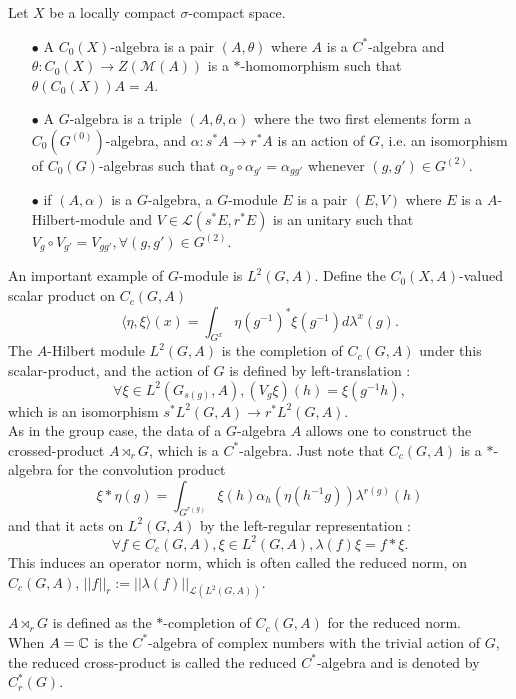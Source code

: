 \begin{definition}
Let $X$ be a locally compact $\sigma$-compact space.\\
\begin{itemize}
\item[$\bullet$] A $C_0(X)$-algebra is a pair $(A,\theta)$ where $A$ is a $C^*$-algebra and $\theta : C_0(X)\rightarrow Z(\mathcal M (A))$ is a $*$-homomorphism such that $\theta (C_0(X))A = A$.\\
\item[$\bullet$] A $G$-algebra is a triple $(A,\theta,\alpha)$ where the two first elements form a $C_0(G^{(0)})$-algebra, and $\alpha : s^* A \rightarrow r^* A $ is an action of $G$, i.e. an isomorphism of $C_0(G)$-algebras such that $\alpha_g \circ \alpha_{g'} = \alpha_{gg'}$ whenever $(g,g')\in G^{(2)}$.\\ 
\item[$\bullet$] if $(A,\alpha)$ is a $G$-algebra, a $G$-module $E$ is a pair $(E,V)$ where $E$ is a $A$-Hilbert-module and $V\in \mathcal L(s^*E,r^*E)$ is an unitary such that $V_g\circ V_{g'} = V_{gg'},\forall (g,g')\in G^{(2)}$.
\end{itemize}
\end{definition}

An important example of $G$-module is $L^2(G,A)$. Define the $C_0(X,A)$-valued scalar product on $C_c(G,A)$
\[ \langle \eta,\xi \rangle(x) = \int_{G^x} \eta(g^{-1})^* \xi(g^{-1}) d\lambda^x(g).\]
The $A$-Hilbert module $L^2(G,A)$ is the completion of $C_c(G,A)$ under this scalar-product, and the action of $G$ is defined by left-translation :
\[\forall \xi\in L^2(G_{s(g)},A),(V_g \xi)(h) = \xi(g^{-1}h), \]
which is an isomorphism $s^*L^2(G,A)\rightarrow r^*L^2(G,A)$.\\

As in the group case, the data of a $G$-algebra $A$ allows one to construct the crossed-product $A\rtimes_r G$, which is a $C^*$-algebra. Just note that $C_c(G,A)$ is a $*$-algebra for the convolution product 
\[\xi \ast \eta  (g)=\int_{G^{r(g)}} \xi(h)\alpha_{h}(\eta(h^{-1}g))\lambda^{r(g)}(h)\]
and that it acts on $L^2(G,A)$ by the left-regular representation :
\[\forall f\in C_c(G,A), \xi\in L^2(G,A),\lambda (f)\xi = f\ast \xi.\]
This induces an operator norm, which is often called the reduced norm, on $C_c(G,A)$, $||f||_{r}:= ||\lambda(f)||_{\mathcal L(L^2(G,A))}$.
\begin{definition}
$A\rtimes_r G$ is defined as the $*$-completion of $C_c(G,A)$ for the reduced norm. \\
When $A=\mathbb C$ is the $C^*$-algebra of complex numbers with the trivial action of $G$, the reduced cross-product is called the reduced $C^*$-algebra and is denoted by $C^*_r(G)$.\\
\end{definition}

